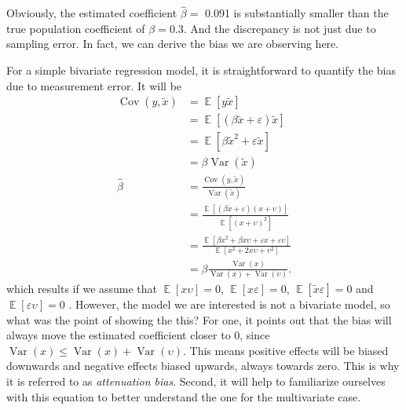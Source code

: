 \documentclass[]{interact}
\theoremstyle{plain}%
\theoremstyle{definition}
\theoremstyle{remark}
\begin{document}
\doublespacing

Obviously, the estimated coefficient \(\hat{\beta} =\) 0.091 is
substantially smaller than the true population coefficient of
\(\beta = 0.3\). And the discrepancy is not just due to sampling error.
In fact, we can derive the bias we are observing here.

For a simple bivariate regression model, it is straightforward to
quantify the bias due to measurement error. It will be \begin{align}
\mathop{\mathrm{\mathrm{Cov}}}(y, \tilde{x}) & = \mathop{\mathrm{\mathbb{E}}}[y \tilde{x}] \\
 & = \mathop{\mathrm{\mathbb{E}}}[(\beta\tilde{x} + \varepsilon)\tilde{x}] \\
 & = \mathop{\mathrm{\mathbb{E}}}[\beta\tilde{x}^{2} + \varepsilon \tilde{x}] \\
 & = \beta \mathop{\mathrm{\mathrm{Var}}}(\tilde{x}) \\
\hat{\beta} & = \frac{\mathop{\mathrm{\mathrm{Cov}}}(y, \tilde{x})}{\mathop{\mathrm{\mathrm{Var}}}(\tilde{x})} \\
 & = \frac{\mathop{\mathrm{\mathbb{E}}}[(\beta x + \varepsilon)(x + \upsilon)]}{\mathop{\mathrm{\mathbb{E}}}[(x + \upsilon)^{2}]} \\
 & = \frac{\mathop{\mathrm{\mathbb{E}}}[\beta x^{2} + \beta x \upsilon + \varepsilon x + \varepsilon \upsilon]}{\mathop{\mathrm{\mathbb{E}}}[x^{2} + 2 x \upsilon + \upsilon^{2}]} \\
 & = \beta \frac{\mathop{\mathrm{\mathrm{Var}}}(x)}{\mathop{\mathrm{\mathrm{Var}}}(x) + \mathop{\mathrm{\mathrm{Var}}}(\upsilon)}.
\end{align} which results if we assume that
\(\mathop{\mathrm{\mathbb{E}}}[x \upsilon] = 0\),
\(\mathop{\mathrm{\mathbb{E}}}[x \varepsilon] = 0\),
\(\mathop{\mathrm{\mathbb{E}}}[\tilde{x} \varepsilon] = 0\) and
\(\mathop{\mathrm{\mathbb{E}}}[\varepsilon \upsilon] = 0\)
\citep{Wooldridge2009}. However, the model we are interested is not a
bivariate model, so what was the point of showing the this? For one, it
points out that the bias will always move the estimated coefficient
closer to 0, since
\(\mathop{\mathrm{\mathrm{Var}}}(x) \le \mathop{\mathrm{\mathrm{Var}}}(x) + \mathop{\mathrm{\mathrm{Var}}}(\upsilon)\).
This means positive effects will be biased downwards and negative
effects biased upwards, always towards zero. This is why it is referred
to as \emph{attenuation bias}. Second, it will help to familiarize
ourselves with this equation to better understand the one for the
multivariate case.
\end{document}
